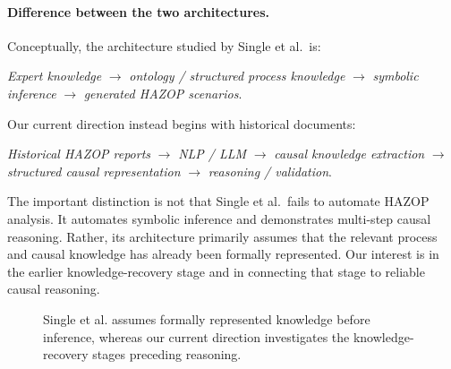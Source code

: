 \paragraph{Difference between the two architectures.}
Conceptually, the architecture studied by Single et al.\ is:

\begin{center}
\emph{Expert knowledge} $\rightarrow$ \emph{ontology / structured process
knowledge} $\rightarrow$ \emph{symbolic inference} $\rightarrow$
\emph{generated HAZOP scenarios}.
\end{center}

Our current direction instead begins with historical documents:

\begin{center}
\emph{Historical HAZOP reports} $\rightarrow$ \emph{NLP / LLM} $\rightarrow$
\emph{causal knowledge extraction} $\rightarrow$ \emph{structured causal
representation} $\rightarrow$ \emph{reasoning / validation}.
\end{center}

The important distinction is not that Single et al.\ fails to automate HAZOP
analysis. It automates symbolic inference and demonstrates multi-step causal
reasoning. Rather, its architecture primarily assumes that the relevant
process and causal knowledge has already been formally represented. Our
interest is in the earlier knowledge-recovery stage and in connecting that
stage to reliable causal reasoning.

\begin{figure}[htbp]
\centering
{}%
\caption[Comparison of the two conceptual architectures]{Single et al.
assumes formally represented knowledge before inference, whereas our current
direction investigates the knowledge-recovery stages preceding reasoning.}
\label{fig:w2-architecture-comparison}
\end{figure}

